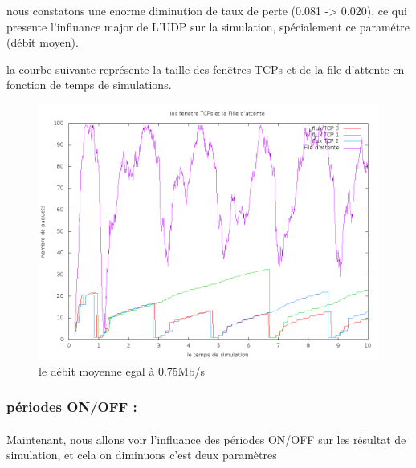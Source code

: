 \documentclass[a4paper]{report}
\theoremstyle{definition}
\begin{document}
nous constatons une enorme diminution de taux de perte (0.081 -> 0.020), ce qui presente l'influance major de L'UDP sur la simulation, spécialement ce paramétre (débit moyen).

la courbe suivante représente la taille des fenêtres TCPs et de la file d'attente en fonction de temps de simulations.  

\begin{figure}[h]
	\centering
		\includegraphics[width=450px]{graphic/rate75on10off5.png}
		\caption{le débit moyenne egal à 0.75Mb/s}
\end{figure}

\newpage

\subsubsection*{périodes ON/OFF  :}
\paragraph*{}
   Maintenant, nous allons voir l'influance des périodes ON/OFF sur les résultat de simulation, et cela on diminuons c'est deux paramètres \\
\end{document}
